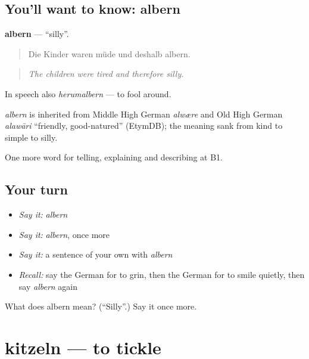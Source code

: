 \subsection*{You'll want to know: albern}
\textbf{albern} — \textquotedblleft{}silly\textquotedblright{}.

\begin{quote}
Die Kinder waren müde und deshalb albern.
\end{quote}

\begin{quote}
\emph{The children were tired and therefore silly.}
\end{quote}

In speech also \emph{herumalbern} — to fool around.

\begin{cousinweb}
\emph{albern} is inherited from Middle High German \emph{alwære} and Old High German \emph{alawāri} \textquotedblleft{}friendly, good-natured\textquotedblright{} (EtymDB); the meaning sank from kind to simple to silly.
\end{cousinweb}

\begin{grammarlens}[title={What you've built}]
One more word for telling, explaining and describing at B1.
\end{grammarlens}

\subsection*{Your turn}
\begin{itemize}
\raggedright
  \item \emph{Say it:} \emph{albern}
  \item \emph{Say it:} \emph{albern}, once more
  \item \emph{Say it:} a sentence of your own with \emph{albern}
  \item \emph{Recall:} say the German for to grin, then the German for to smile quietly, then say \emph{albern} again
\end{itemize}

\begin{tcolorbox}[breakable,colback=teal!4,colframe=teal!35!black,title={Before you move on}]
What does albern mean? (\textquotedblleft{}Silly\textquotedblright{}.) Say it once more.
\end{tcolorbox}
\section[kitzeln]{kitzeln — to tickle}

